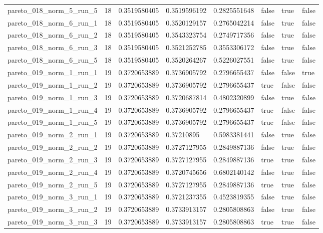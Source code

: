 \begin{tabular}{@{}llllllll@{}}
pareto\_018\_norm\_5\_run\_5 & 18 & 0.3519580405 & 0.3519596192 & 0.2825551648 & false & true & false \\
pareto\_018\_norm\_6\_run\_1 & 18 & 0.3519580405 & 0.3520129157 & 0.2765042214 & false & true & false \\
pareto\_018\_norm\_6\_run\_2 & 18 & 0.3519580405 & 0.3543323754 & 0.2749717356 & false & true & false \\
pareto\_018\_norm\_6\_run\_3 & 18 & 0.3519580405 & 0.3521252785 & 0.3553306172 & false & true & false \\
pareto\_018\_norm\_6\_run\_5 & 18 & 0.3519580405 & 0.3520264267 & 0.5226027551 & false & true & false \\
pareto\_019\_norm\_1\_run\_1 & 19 & 0.3720653889 & 0.3736905792 & 0.2796655437 & false & false & true \\
pareto\_019\_norm\_1\_run\_2 & 19 & 0.3720653889 & 0.3736905792 & 0.2796655437 & true & false & false \\
pareto\_019\_norm\_1\_run\_3 & 19 & 0.3720653889 & 0.3720687814 & 0.4802320899 & false & true & false \\
pareto\_019\_norm\_1\_run\_4 & 19 & 0.3720653889 & 0.3736905792 & 0.2796655437 & true & false & false \\
pareto\_019\_norm\_1\_run\_5 & 19 & 0.3720653889 & 0.3736905792 & 0.2796655437 & true & false & false \\
pareto\_019\_norm\_2\_run\_1 & 19 & 0.3720653889 & 0.37210895 & 0.5983381441 & false & true & false \\
pareto\_019\_norm\_2\_run\_2 & 19 & 0.3720653889 & 0.3727127955 & 0.2849887136 & false & true & false \\
pareto\_019\_norm\_2\_run\_3 & 19 & 0.3720653889 & 0.3727127955 & 0.2849887136 & true & true & false \\
pareto\_019\_norm\_2\_run\_4 & 19 & 0.3720653889 & 0.3720745656 & 0.6802140142 & false & true & false \\
pareto\_019\_norm\_2\_run\_5 & 19 & 0.3720653889 & 0.3727127955 & 0.2849887136 & true & true & false \\
pareto\_019\_norm\_3\_run\_1 & 19 & 0.3720653889 & 0.3721237355 & 0.4523819355 & false & true & false \\
pareto\_019\_norm\_3\_run\_2 & 19 & 0.3720653889 & 0.3733913157 & 0.2805808863 & false & true & false \\
pareto\_019\_norm\_3\_run\_3 & 19 & 0.3720653889 & 0.3733913157 & 0.2805808863 & true & true & false \\

\end{tabular}
